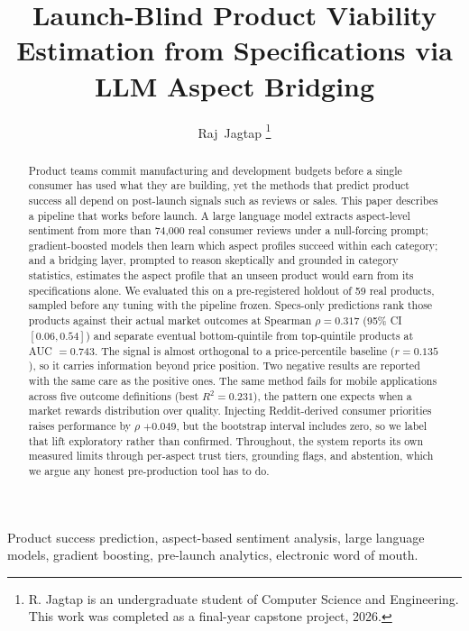 \documentclass[journal]{IEEEtran}
\begin{document}
\title{Launch-Blind Product Viability Estimation from Specifications via LLM Aspect Bridging}

\author{Raj~Jagtap%
\thanks{R. Jagtap is an undergraduate student of Computer Science and Engineering. This work was completed as a final-year capstone project, 2026.}}

\maketitle

\begin{abstract}
Product teams commit manufacturing and development budgets before a single consumer has used what they are building, yet the methods that predict product success all depend on post-launch signals such as reviews or sales. This paper describes a pipeline that works before launch. A large language model extracts aspect-level sentiment from more than 74{,}000 real consumer reviews under a null-forcing prompt; gradient-boosted models then learn which aspect profiles succeed within each category; and a bridging layer, prompted to reason skeptically and grounded in category statistics, estimates the aspect profile that an unseen product would earn from its specifications alone. We evaluated this on a pre-registered holdout of 59 real products, sampled before any tuning with the pipeline frozen. Specs-only predictions rank those products against their actual market outcomes at Spearman $\rho = 0.317$ (95\% CI $[0.06, 0.54]$) and separate eventual bottom-quintile from top-quintile products at AUC $= 0.743$. The signal is almost orthogonal to a price-percentile baseline ($r = 0.135$), so it carries information beyond price position. Two negative results are reported with the same care as the positive ones. The same method fails for mobile applications across five outcome definitions (best $R^2 = 0.231$), the pattern one expects when a market rewards distribution over quality. Injecting Reddit-derived consumer priorities raises performance by $\rho$ $+0.049$, but the bootstrap interval includes zero, so we label that lift exploratory rather than confirmed. Throughout, the system reports its own measured limits through per-aspect trust tiers, grounding flags, and abstention, which we argue any honest pre-production tool has to do.
\end{abstract}

\begin{IEEEkeywords}
Product success prediction, aspect-based sentiment analysis, large language models, gradient boosting, pre-launch analytics, electronic word of mouth.
\end{IEEEkeywords}
\end{document}
